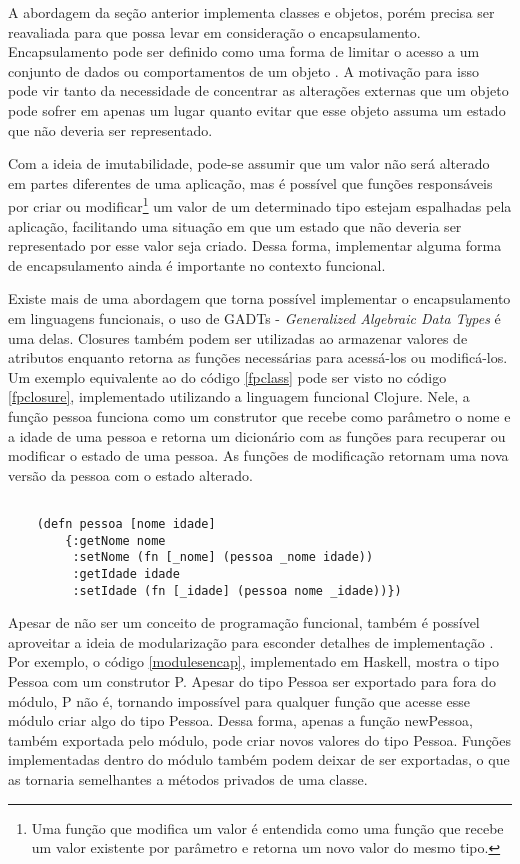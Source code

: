 A abordagem da seção anterior implementa 
classes e objetos, porém precisa ser 
reavaliada para que possa levar em consideração 
o encapsulamento. Encapsulamento pode ser definido 
como uma forma de limitar o acesso a um conjunto 
de dados ou comportamentos de um objeto \cite{quarkoo}. 
A motivação para isso pode vir tanto da necessidade 
de concentrar as alterações externas que um objeto 
pode sofrer em apenas um lugar quanto evitar que 
esse objeto assuma um estado que não deveria ser 
representado. 

Com a ideia de imutabilidade, pode-se 
assumir que um valor não será alterado em partes 
diferentes de uma aplicação, mas é possível 
que funções responsáveis por criar ou modificar\footnote{
    Uma função que modifica um valor é entendida 
    como uma função que recebe um valor existente 
    por parâmetro e retorna um novo valor do mesmo 
    tipo.
} 
um valor de um determinado tipo estejam 
espalhadas pela aplicação, facilitando uma 
situação em que um estado que não deveria ser 
representado por esse valor seja criado. 
Dessa forma, implementar alguma forma de 
encapsulamento ainda é importante no 
contexto funcional.

Existe mais de uma abordagem que torna 
possível implementar o encapsulamento em 
linguagens funcionais, o uso de GADTs - 
\textit{Generalized Algebraic 
Data Types}\cite{existentialhaskell} é uma 
delas. Closures também podem 
ser utilizadas ao armazenar valores de 
atributos enquanto retorna as funções 
necessárias para acessá-los ou modificá-los. 
Um exemplo equivalente ao do código \ref{fpclass} 
pode ser visto no código \ref{fpclosure}, 
implementado utilizando a linguagem funcional Clojure. 
\cite{classlessjs} Nele, a função pessoa 
funciona como um construtor que recebe como 
parâmetro o nome e a idade de uma pessoa e 
retorna um dicionário com as funções para 
recuperar ou modificar o estado de uma pessoa.
As funções de modificação retornam uma nova versão 
da pessoa com o estado alterado.

\begin{lstlisting}[caption={Representação de uma classe com closures},label=fpclosure]
    
    (defn pessoa [nome idade]
        {:getNome nome
         :setNome (fn [_nome] (pessoa _nome idade))
         :getIdade idade
         :setIdade (fn [_idade] (pessoa nome _idade))})

\end{lstlisting}

Apesar de não ser um conceito de programação 
funcional, também é possível aproveitar a ideia 
de modularização para esconder detalhes de 
implementação \cite{mlmodules}. Por exemplo, o 
código \ref{modulesencap}, implementado em 
Haskell, mostra o tipo Pessoa com um construtor 
P. Apesar do tipo Pessoa ser exportado para fora do 
módulo, P não é, tornando impossível para qualquer 
função que acesse esse módulo criar algo do tipo 
Pessoa. Dessa forma, apenas a função newPessoa, 
também exportada pelo módulo, 
pode criar novos valores do tipo 
Pessoa. Funções implementadas dentro do módulo 
também podem deixar de ser exportadas, o que 
as tornaria semelhantes a métodos privados 
de uma classe.

